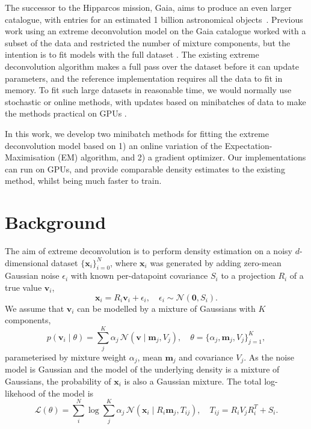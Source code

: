 \documentclass{article}
\newcommand{\bx}{\mathbf{x}}
\newcommand{\bv}{\mathbf{v}}
\newcommand{\bm}{\mathbf{m}}
\begin{document}
The successor to the Hipparcos mission, Gaia, aims to produce an even larger catalogue, with entries for an estimated 1 billion astronomical objects~\cite{collaborationGaiaMission2016}.
Previous work using an extreme deconvolution model on the Gaia catalogue %
worked with a subset of the data and restricted the number of mixture components,
but the intention is to fit models with the full dataset
\cite{andersonImprovingGaiaParallax2018}.
The existing extreme deconvolution algorithm makes a full pass over the dataset before it can update parameters, and the reference implementation requires all the data to fit in memory. To fit such large datasets in reasonable time, we would normally use stochastic or online methods, with updates based on minibatches of data to make the methods practical on GPUs \cite{bottou2018}.

In this work, we develop two minibatch methods for fitting the extreme deconvolution model
based on 1) an online variation of the Expectation-Maximisation (EM) algorithm, and 2) a gradient optimizer.
Our implementations can run on GPUs, and provide comparable density estimates to the existing method, whilst being much faster to train.

\section{Background}

The aim of extreme deconvolution is to perform density estimation on a noisy $d$-dimensional dataset $\{\bx_i\}_{i=0}^N$, where $\bx_i$ was generated by adding zero-mean Gaussian noise $\epsilon_i$ with known per-datapoint covariance $S_i$ to a projection $R_i$ of a true value $\bv_i$,
\begin{equation}
  \bx_i = R_i\bv_i + \epsilon_i,\quad  \epsilon_i \sim \mathcal{N}(\mathbf{0}, S_i).
\end{equation}
We assume that $\bv_i$ can be modelled by a mixture of Gaussians with $K$ components,
\begin{equation}
p(\bv_i \mid \theta) = \sum_j^K \alpha_j \,\mathcal{N}(\bv \mid \bm_j, V_j), \quad \theta = \{\alpha_j, \bm_j, V_j\}_{j=1} ^ K,
\end{equation}
parameterised by mixture weight $\alpha_j$, mean $\bm_j$ and covariance $V_j$.
As the noise model is Gaussian and the model of the underlying density is a mixture of Gaussians, the probability of $\bx_i$ is also a Gaussian mixture.
The total log-likehood of the model is
\begin{equation}
\mathcal{L}(\theta) = \sum_i^N \log \sum_j^K \alpha_j\,\mathcal{N}(\bx_i \mid R_i\bm_j, T_{ij}), \quad T_{ij} = R_iV_jR_i^T + S_i.
\end{equation}
\end{document}
